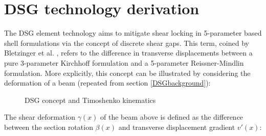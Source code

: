 
\chapter{DSG technology derivation}
\label{app:DSG technology derivation}
\renewcommand{\Thema}{DSG technology derivation}

The DSG element technology aims to mitigate shear locking in 5-parameter based shell formulations via the concept of discrete shear gaps. This term, coined by Bletzinger et al. \cite{Ble00}, refers to the difference in transverse displacements between a pure 3-parameter Kirchhoff formulation and a 5-parameter Reissner-Mindlin formulation. More explicitly, this concept can be illustrated by considering the deformation of a beam (repeated from section \ref{DSGbackground}):

\begin{figure}[H]
	\caption{\label{DSG_derivation_pic1}DSG concept and Timoshenko kinematics}
\end{figure}

The shear deformation $\gamma(x)$ of the beam above is defined as the difference between the section rotation $\beta(x)$ and transverse displacement gradient $v'(x)$:

